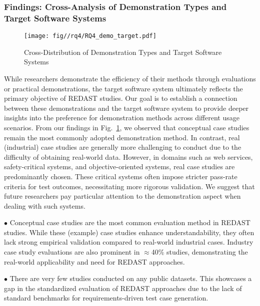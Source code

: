 \subsubsection{Findings: Cross-Analysis of Demonstration Types and Target Software Systems}
\label{sec:findings_demo_target}
\begin{figure}
    \centering
    \texttt{[image: fig//rq4/RQ4\_demo\_target.pdf]}
    \caption{Cross-Distribution of Demonstration Types and Target Software Systems}
    \label{fig:target_demo}
\end{figure}
While researchers demonstrate the efficiency of their methods through evaluations or practical demonstrations, the target software system ultimately reflects the primary objective of REDAST studies. Our goal is to establish a connection between these demonstrations and the target software system to provide deeper insights into the preference for demonstration methods across different usage scenarios. From our findings in Fig.~\ref{fig:target_demo}, we observed that conceptual case studies remain the most commonly adopted demonstration method. In contrast, real (industrial) case studies are generally more challenging to conduct due to the difficulty of obtaining real-world data. However, in domains such as web services, safety-critical systems, and objective-oriented systems, real case studies are predominantly chosen. These critical systems often impose stricter pass-rate criteria for test outcomes, necessitating more rigorous validation. We suggest that future researchers pay particular attention to the demonstration aspect when dealing with such systems.


\begin{tcolorbox}[mybox, breakable, title=RQ4 Key Takeaways]
$\bullet$ Conceptual case studies are the most common evaluation method in REDAST studies. While these (example) case studies enhance understandability, they often lack strong empirical validation compared to real-world industrial cases. Industry case study evaluations are also prominent in $\approx$40\% studies, demonstrating the real-world applicability and need for REDAST approaches.

$\bullet$ There are very few studies conducted on any public datasets. This showcases a gap in the standardized evaluation of REDAST approaches due to the lack of standard benchmarks for requirements-driven test case generation.

\end{tcolorbox}